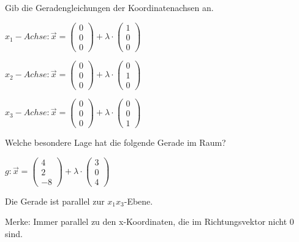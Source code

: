 \documentclass[paper=a6,landscape,ngerman,twoside=true,fontsize=12pt]{scrartcl}
\begin{document}
\begin{frage}
	\LARGE
	Gib die Geradengleichungen der Koordinatenachsen an.
\end{frage}
\begin{antwort}
	\Large
	$x_1-Achse:\vec{x}=\left(\begin{array}{c} 0 \\ 0 \\ 0\end{array} \right)+\lambda \cdot \left(\begin{array}{c} 1 \\ 0 \\ 0\end{array} \right)$
	
	$x_2-Achse:\vec{x}=\left(\begin{array}{c} 0 \\ 0 \\ 0\end{array} \right)+\lambda \cdot \left(\begin{array}{c} 0 \\ 1 \\ 0\end{array} \right)$
	
	$x_3-Achse:\vec{x}=\left(\begin{array}{c} 0 \\ 0 \\ 0\end{array} \right)+\lambda \cdot \left(\begin{array}{c} 0 \\ 0 \\ 1\end{array} \right)$
	
	
\end{antwort}	
\begin{frage}
	\LARGE
	Welche besondere Lage hat die folgende Gerade im Raum?
	
	$g:\vec{x}=\left(\begin{array}{c} 4 \\ 2 \\ -8\end{array} \right)+\lambda \cdot \left(\begin{array}{c} 3 \\ 0 \\ 4\end{array} \right)$
\end{frage}
\begin{antwort}
	\Large
	Die Gerade ist parallel zur $x_1x_3$-Ebene.
	
	Merke: Immer parallel zu den x-Koordinaten, die im Richtungsvektor nicht 0 sind.
	
	
\end{antwort}	
\end{document}
